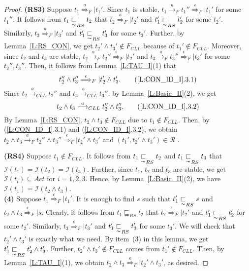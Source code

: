 \documentclass{elsarticle}
\theoremstyle{plain}
\theoremstyle{definition}
\begin{document}
\begin{proof}
   \textbf{(RS3)} Suppose $t_1 \stackrel{a}{\Longrightarrow}_F| t_1'$. Since $t_1$ is stable, $t_1 \stackrel{a}{\longrightarrow}_F t_1'' \stackrel{\epsilon}{\Longrightarrow}_F| t_1'$ for some $t_1''$.
   It follows from $t_1 \underset{\thicksim}{\sqsubset}_{RS} t_2$ that $t_2 \stackrel{a}{\Longrightarrow}_F| t_2'$ and $t_1' \underset{\thicksim}{\sqsubset}_{RS} t_2'$ for some $t_2'$.
    Similarly, $t_3 \stackrel{a}{\Longrightarrow}_F| t_3'$ and $t_1' \underset{\thicksim}{\sqsubset}_{RS} t_3'$ for some $t_3'$.
     Further, by Lemma~\ref{L:RS_CON}, we get $t_2'\wedge t_3' \notin F_{{CLL}}$ because of $t_1' \notin F_{{CLL}}$.
   Moreover, since $t_2$ and $t_3$ are stable, $t_2 \stackrel{a}{\longrightarrow}_F t_2'' \stackrel{\epsilon}{\Longrightarrow}_F| t_2'$ and $t_3 \stackrel{a}{\longrightarrow}_F t_3'' \stackrel{\epsilon}{\Longrightarrow}_F| t_3'$ for some $t_2'',t_3''$.
   Then, it follows from Lemma~\ref{L:TAU_I}(1) that \[t_2'' \wedge t_3'' \stackrel{\epsilon}{\Longrightarrow}_F| t_2' \wedge t_3'.\tag{\ref{L:CON_ID_I}.3.1}\]
   Since  $t_2 \stackrel{a}{\longrightarrow}_{{CLL}} t_2''$ and $t_3 \stackrel{a}{\longrightarrow}_{{CLL}} t_3''$, by Lemma~\ref{L:Basic_II}(2), we get \[t_2 \wedge t_3 \stackrel{a}{\longrightarrow}_{{CLL}} t_2'' \wedge t_3''.\tag{\ref{L:CON_ID_I}.3.2}\]
    By Lemma~\ref{L:RS_CON}, $t_2 \wedge t_3 \notin F_{{CLL}}$ due to $t_1 \notin F_{{CLL}}$.
    Then, by (\ref{L:CON_ID_I}.3.1) and (\ref{L:CON_ID_I}.3.2), we obtain $t_2 \wedge t_3 \stackrel{a}{\longrightarrow}_F t_2''\wedge t_3'' \stackrel{\epsilon}{\Longrightarrow}_F| t_2' \wedge t_3'$ and $(t_1', t_2' \wedge t_3') \in {\mathcal R}$ .

   \textbf{(RS4)} Suppose $t_1 \notin F_{{CLL}}$.
    It follows from $t_1 \underset{\thicksim}{\sqsubset}_{RS} t_2$ and $t_1 \underset{\thicksim}{\sqsubset}_{RS} t_3$ that ${\mathcal I}(t_1) = {\mathcal I}(t_2) = {\mathcal I}(t_3)$.
    Further, since $t_1$, $t_2$ and $t_3$ are stable, we get ${\mathcal I}(t_i)\subseteq Act$ for $i=1,2,3$.
    Hence, by Lemma~\ref{L:Basic_II}(2), we have  ${\mathcal I}(t_1) = {\mathcal I}(t_2 \wedge t_3)$.\\

\noindent \textbf{(4)} Suppose $t_1 \stackrel{\epsilon}{\Longrightarrow}_F| t_1'$.
    It is enough to find $s$ such that $t_1' \underset{\thicksim}{\sqsubset}_{RS} s$ and $t_2\wedge t_3 \stackrel{\epsilon}{\Longrightarrow}_F|s$.
    Clearly, it follows from $t_1 \sqsubseteq_{RS} t_2 $ that $t_2 \stackrel{\epsilon}{\Longrightarrow}_F| t_2'$ and $t_1' \underset{\thicksim}{\sqsubset}_{RS} t_2'$ for some $t_2'$. Similarly, $t_3 \stackrel{\epsilon}{\Longrightarrow}_F| t_3'$ and $t_1' \underset{\thicksim}{\sqsubset}_{RS} t_3'$ for some $t_3'$.
    We will check that $t_2' \wedge t_3'$ is exactly what we need.
    By item~(3) in this lemma, we get $t_1'  \underset{\thicksim}{\sqsubset}_{RS} t_2' \wedge t_3'$.
    Further, $ t_2' \wedge t_3' \notin F_{{CLL}}$ comes from $t_1' \notin F_{{CLL}}$. Then,  by Lemma~\ref{L:TAU_I}(1), we obtain $t_2 \wedge t_3 \stackrel{\epsilon}{\Longrightarrow}_F| t_2' \wedge t_3'$, as desired.
\end{proof}
\end{document}
